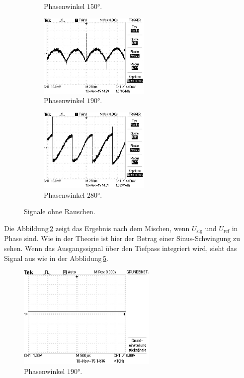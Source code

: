 \begin{figure}
\begin{subfigure}{0.48\textwidth}
\caption{Phasenwinkel $150°$.}
\label{fig:orp150}
\end{subfigure}
\begin{subfigure}{0.48\textwidth}
\centering
\includegraphics[height=4cm]{Bilder/or/or190.JPG}
\caption{Phasenwinkel $190°$.}
\label{fig:orp190}
\end{subfigure}
\begin{subfigure}{0.48\textwidth}
\centering
\includegraphics[height=4cm]{Bilder/or/or280.JPG}
\caption{Phasenwinkel $280°$.}
\label{fig:orp280}
\end{subfigure}
\caption{Signale ohne Rauschen.}
\label{fig:Signale ohne Rauschen}
\end{figure}
Die Abbildung\,\ref{fig:orp190} zeigt das Ergebnis nach dem Mischen, wenn $U_\text{sig}$
und $U_\text{ref}$ in Phase sind. Wie in der Theorie ist hier der Betrag einer Sinus-Schwingung
zu sehen. Wenn das Ausgangssignal über den Tiefpass integriert wird, sieht das
Signal aus wie in der Abblidung\,\ref{fig:int}.
\begin{figure}
  \centering
  \includegraphics[height=5cm]{Bilder/int/INT.JPG}
  \caption{Phasenwinkel $190°$.}
  \label{fig:int}
\end{figure}
